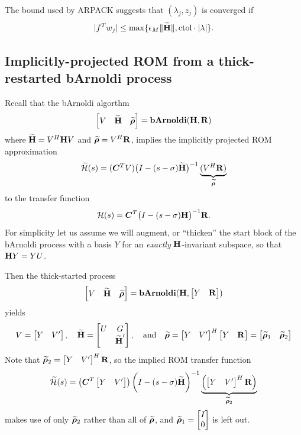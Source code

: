 The bound used by ARPACK suggests that $(\lambda_j,z_j)$ is converged if   
\[
|f^T w_j| \leq \max\{ \epsilon_M \| \widetilde{\textbf{\textup{H}}} \|, \text{ctol}\cdot  |\lambda| \}.
\]


\subsection{Implicitly-projected ROM from a thick-restarted bArnoldi process} 
Recall that the bArnoldi algorthm 
\begin{equation}
\mat{V & \Himp & \rrimp} = \bA(\H,\RR)
\label{eq:bAalg}
\end{equation}
where $\widetilde{\textbf{\textup{H}}} = V^H\textbf{\textup{H}} V$ and $\widetilde{\boldsymbol{\rho}} = V^H \textbf{\textup{R}}$, implies the implicitly projected ROM approximation 
\begin{equation}
\tfimp(s) = (\CC^T V)\big( I - (s-\sigma) \Himp \big)^{-1} \underbrace{(\c{V}\RR)}_{\rrimp}
\label{eg:bA_tfimp}
\end{equation}
to the transfer function 
\begin{equation*}
\mathcal{H}(s) = \bm{C}^T\big( I - (s-\sigma) \textbf{\textup{H}} \big)^{-1}\textbf{\textup{R}}. 
\end{equation*}
For simplicity let us assume we will augment, or ``thicken'' the start block of the bArnoldi process with a basis $Y$ for an \emph{exactly} $\textbf{\textup{H}}$-invariant subspace, so that $\textbf{\textup{H}} Y = Y U$.  

Then the thick-started process
\begin{equation}
\mat{V & \Himp & \rrimp} = \bA(\H,\mat{Y &\RR})
\label{eq:thick_bAalg}
\end{equation}
yields 
\begin{equation*}
V = \begin{bmatrix} Y&V^\prime\end{bmatrix}, \quad \widetilde{\textbf{\textup{H}}} = \begin{bmatrix} U&G\\&\widetilde{\textbf{\textup{H}}}^\prime\end{bmatrix},   
\quad\text{and}\quad
\widetilde{\boldsymbol{\rho}} = \begin{bmatrix} Y&V^\prime\end{bmatrix}^H\begin{bmatrix} Y &\textbf{\textup{R}}\end{bmatrix} = \begin{bmatrix} \widetilde{\boldsymbol{\rho}}_1 & \widetilde{\boldsymbol{\rho}}_2\end{bmatrix}
\end{equation*}
Note that $\widetilde{\boldsymbol{\rho}}_2 = \begin{bmatrix} Y&V^\prime\end{bmatrix}^H \textbf{\textup{R}}$, so the implied ROM transfer function
 \begin{equation}
\tfimp(s) = \left( \CC^T\mat{Y&V^\prime} \right)
\bigg( I - (s-\sigma) \Himp \bigg)^{-1} \underbrace{\left(\c{\mat{Y&V^\prime}}\RR \right) }_{\rrimp_2}
\label{eg:thick_bA_tfimp}
\end{equation}
makes use of only $\widetilde{\boldsymbol{\rho}}_2$ rather than all of $\widetilde{\boldsymbol{\rho}}$, and  $\widetilde{\boldsymbol{\rho}}_1 = \begin{bmatrix} I\\0\end{bmatrix}$ is left out. 
 

